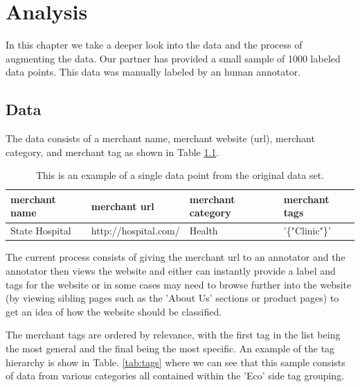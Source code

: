\chapter{Analysis}

In this chapter we take a deeper look into the data and the process of augmenting the data. Our partner has provided a small sample of 1000 labeled data points. This data was manually labeled by an human annotator. 

\section{Data}

The data consists of a merchant name, merchant website (url), merchant category, and merchant tag as shown in Table \ref{tab:data_point}. 

\begin{table}[h]
\begin{tabular}{|l|l|l|l|}
\hline
merchant name            & merchant url            & merchant category & merchant tags           \\ \hline
State Hospital & http://hospital.com/ & Health   & '\{"Clinic"\}' \\ \hline
\end{tabular}
\caption{This is an example of a single data point from the original data set.}
\label{tab:data_point}
\end{table}


The current process consists of giving the merchant url to an annotator and the annotator then views the website and either can instantly  provide a label and tags for the website or in some cases may need to browse further into the website (by viewing sibling pages such as the 'About Us' sections or product pages) to get an idea of how the website should be classified. 

The merchant tags are ordered by relevance, with the first tag in the list being the most general and the final being the most specific. An example of the tag hierarchy is show in Table. \ref{tab:tags} where we can see that this sample consists of data from various categories all contained within the 'Eco' side tag grouping.


